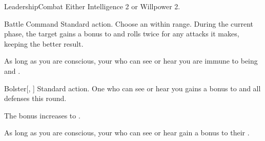   \begin{feat}{Leadership}{Combat}
    \featpre Either Intelligence 2 or Willpower 2.

    \begin{activeability}{Battle Command}
      \abilityusagetime Standard action.
      \rankline
      Choose an  within \rngmed range.
      During the current phase, the target gains a  bonus to  and rolls twice for any attacks it makes, keeping the better result.
    \end{activeability}

     As long as you are conscious, your  who can see or hear you are immune to being \frightened and \panicked.

    \begin{activeability}{Bolster}[, ]
      \abilityusagetime Standard action.
      \rankline
      One  who can see or hear you gains a  bonus to  and all defenses this round.

      \rankline
       The bonus increases to .
    \end{activeability}

     As long as you are conscious, your  who can see or hear gain a  bonus to their .
  \end{feat}

